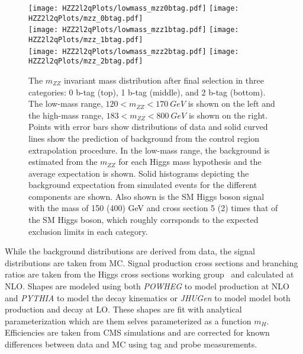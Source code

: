 \begin{figure}
\begin{center}
\texttt{[image: HZZ2l2qPlots/lowmass\_mzz0btag.pdf]}
\texttt{[image: HZZ2l2qPlots/mzz\_0btag.pdf]}\\
\texttt{[image: HZZ2l2qPlots/lowmass\_mzz1btag.pdf]}
\texttt{[image: HZZ2l2qPlots/mzz\_1btag.pdf]}\\
\texttt{[image: HZZ2l2qPlots/lowmass\_mzz2btag.pdf]}
\texttt{[image: HZZ2l2qPlots/mzz\_2btag.pdf]}
\label{fig:HZZ2l2qMassDistributions}
\caption{The $m_{ZZ}$ invariant mass distribution after final selection in
three categories: 0 b-tag (top), 1 b-tag (middle), and 2 b-tag (bottom). 
The low-mass range, $120<m_{ZZ}<170~GeV$ is shown on the left and the
high-mass range, $183<m_{ZZ}<800~GeV$ is shown on the right.  Points with
error bars show distributions of data and solid curved lines show the 
prediction of background from the control region extrapolation procedure.
In the low-mass range, the background is estimated from the $m_{ZZ}$ for
each Higgs mass hypothesis and the average expectation is shown.  Solid
histograms depicting the background expectation from simulated events
for the different components are shown.  Also shown is the SM Higgs boson
signal with the mass of 150 (400) GeV and cross section 5 (2) times that 
of the SM Higgs boson, which roughly corrsponds to the expected exclusion 
limits in each category.}
\end{center}
\end{figure}

While the background distributions are derived from data, the signal
distributions are taken from MC.  Signal production cross sections
and branching ratios are taken from the Higgs cross sections working
group~\cite{??} and calculated at NLO.  Shapes are modeled using both
{\it POWHEG} to model production at NLO and {\it PYTHIA} to model the 
decay kinematics or {\it JHUGen} to model model both production and
decay at LO.  These shapes are fit with analytical parameterization
which are them selves parameterized as a function $m_H$.  Efficiencies 
are taken from CMS simulations and are
corrected for known differences between data and MC using tag and
probe measurements.  

